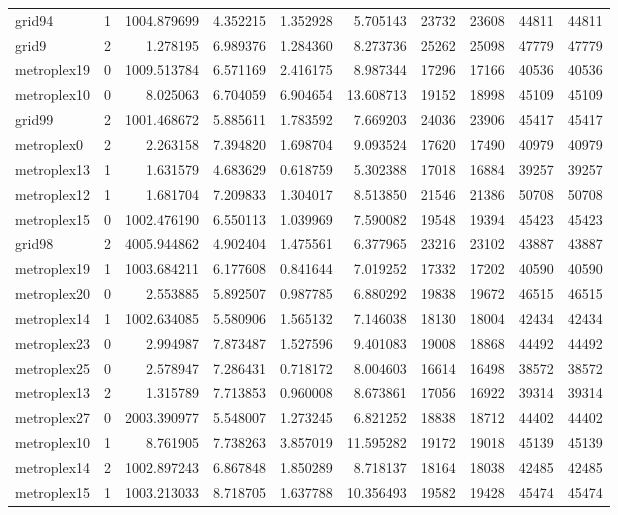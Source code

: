 \begin{longtable}{|l|r|r|r|r|r|r|r|r|r|}
grid94 & 1 & 1004.879699 & 4.352215 & 1.352928 & 5.705143 & 23732 & 23608 & 44811 & 44811 \\
grid9 & 2 & 1.278195 & 6.989376 & 1.284360 & 8.273736 & 25262 & 25098 & 47779 & 47779 \\
metroplex19 & 0 & 1009.513784 & 6.571169 & 2.416175 & 8.987344 & 17296 & 17166 & 40536 & 40536 \\
metroplex10 & 0 & 8.025063 & 6.704059 & 6.904654 & 13.608713 & 19152 & 18998 & 45109 & 45109 \\
grid99 & 2 & 1001.468672 & 5.885611 & 1.783592 & 7.669203 & 24036 & 23906 & 45417 & 45417 \\
metroplex0 & 2 & 2.263158 & 7.394820 & 1.698704 & 9.093524 & 17620 & 17490 & 40979 & 40979 \\
metroplex13 & 1 & 1.631579 & 4.683629 & 0.618759 & 5.302388 & 17018 & 16884 & 39257 & 39257 \\
metroplex12 & 1 & 1.681704 & 7.209833 & 1.304017 & 8.513850 & 21546 & 21386 & 50708 & 50708 \\
metroplex15 & 0 & 1002.476190 & 6.550113 & 1.039969 & 7.590082 & 19548 & 19394 & 45423 & 45423 \\
grid98 & 2 & 4005.944862 & 4.902404 & 1.475561 & 6.377965 & 23216 & 23102 & 43887 & 43887 \\
metroplex19 & 1 & 1003.684211 & 6.177608 & 0.841644 & 7.019252 & 17332 & 17202 & 40590 & 40590 \\
metroplex20 & 0 & 2.553885 & 5.892507 & 0.987785 & 6.880292 & 19838 & 19672 & 46515 & 46515 \\
metroplex14 & 1 & 1002.634085 & 5.580906 & 1.565132 & 7.146038 & 18130 & 18004 & 42434 & 42434 \\
metroplex23 & 0 & 2.994987 & 7.873487 & 1.527596 & 9.401083 & 19008 & 18868 & 44492 & 44492 \\
metroplex25 & 0 & 2.578947 & 7.286431 & 0.718172 & 8.004603 & 16614 & 16498 & 38572 & 38572 \\
metroplex13 & 2 & 1.315789 & 7.713853 & 0.960008 & 8.673861 & 17056 & 16922 & 39314 & 39314 \\
metroplex27 & 0 & 2003.390977 & 5.548007 & 1.273245 & 6.821252 & 18838 & 18712 & 44402 & 44402 \\
metroplex10 & 1 & 8.761905 & 7.738263 & 3.857019 & 11.595282 & 19172 & 19018 & 45139 & 45139 \\
metroplex14 & 2 & 1002.897243 & 6.867848 & 1.850289 & 8.718137 & 18164 & 18038 & 42485 & 42485 \\
metroplex15 & 1 & 1003.213033 & 8.718705 & 1.637788 & 10.356493 & 19582 & 19428 & 45474 & 45474 \\

\end{longtable}
